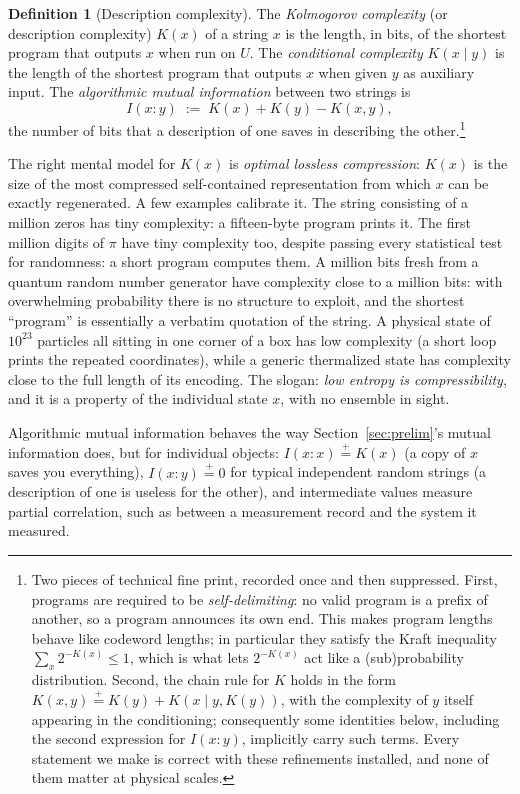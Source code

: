 \documentclass[10pt]{article}
\theoremstyle{definition}
\newtheorem{definition}[theorem]{Definition}
\theoremstyle{remark}
\newcommand{\peq}{\mathrel{\stackrel{+}{=}}}
\begin{document}
\begin{definition}[Description complexity]
\label{def:K}
The \emph{Kolmogorov complexity} (or description complexity) $K(x)$ of a string $x$ is the length, in bits, of the shortest program that outputs $x$ when run on $U$. The \emph{conditional complexity} $K(x \mid y)$ is the length of the shortest program that outputs $x$ when given $y$ as auxiliary input. The \emph{algorithmic mutual information} between two strings is
\[
I(x : y) \;:=\; K(x) + K(y) - K(x, y),
\]
the number of bits that a description of one saves in describing the other.\footnote{Two pieces of technical fine print, recorded once and then suppressed. First, programs are required to be \emph{self-delimiting}: no valid program is a prefix of another, so a program announces its own end. This makes program lengths behave like codeword lengths; in particular they satisfy the Kraft inequality $\sum_x 2^{-K(x)} \le 1$, which is what lets $2^{-K(x)}$ act like a (sub)probability distribution. Second, the chain rule for $K$ holds in the form $K(x,y) \peq K(y) + K(x \mid y, K(y))$, with the complexity of $y$ itself appearing in the conditioning; consequently some identities below, including the second expression for $I(x:y)$, implicitly carry such terms. Every statement we make is correct with these refinements installed, and none of them matter at physical scales.}
\end{definition}

The right mental model for $K(x)$ is \emph{optimal lossless compression}: $K(x)$ is the size of the most compressed self-contained representation from which $x$ can be exactly regenerated. A few examples calibrate it. The string consisting of a million zeros has tiny complexity: a fifteen-byte program prints it. The first million digits of $\pi$ have tiny complexity too, despite passing every statistical test for randomness: a short program computes them. A million bits fresh from a quantum random number generator have complexity close to a million bits: with overwhelming probability there is no structure to exploit, and the shortest ``program'' is essentially a verbatim quotation of the string. A physical state of $10^{23}$ particles all sitting in one corner of a box has low complexity (a short loop prints the repeated coordinates), while a generic thermalized state has complexity close to the full length of its encoding. The slogan: \emph{low entropy is compressibility}, and it is a property of the individual state $x$, with no ensemble in sight.

Algorithmic mutual information behaves the way Section~\ref{sec:prelim}'s mutual information does, but for individual objects: $I(x : x) \peq K(x)$ (a copy of $x$ saves you everything), $I(x : y) \peq 0$ for typical independent random strings (a description of one is useless for the other), and intermediate values measure partial correlation, such as between a measurement record and the system it measured.
\end{document}
